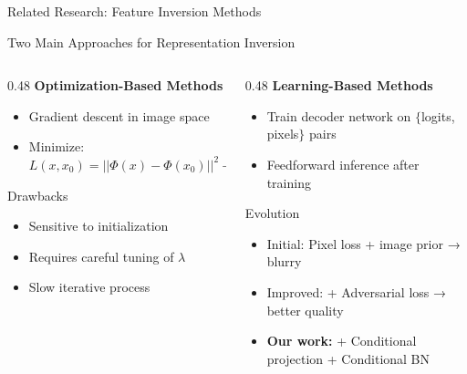 \documentclass{beamer}
\begin{document}
\begin{frame}{Related Research: Feature Inversion Methods}
\begin{block}{Two Main Approaches for Representation Inversion}

\begin{columns}[T]
\begin{column}{0.48\textwidth}
\centering
\textbf{Optimization-Based Methods}
\begin{itemize}
\item Gradient descent in image space
\item Minimize: 
\small
$L(x, x_0) = ||\Phi(x) - \Phi(x_0)||^2 + \lambda R(x)$
\normalsize

\end{itemize}

\begin{alertblock}{Drawbacks}
\begin{itemize}
\item Sensitive to initialization
\item Requires careful tuning of $\lambda$
\item Slow iterative process
\end{itemize}
\end{alertblock}
\end{column}

\begin{column}{0.48\textwidth}
\centering
\textbf{Learning-Based Methods}
\begin{itemize}
\item Train decoder network on $\{$logits, pixels$\}$ pairs
\item Feedforward inference after training

\end{itemize}

\begin{exampleblock}{Evolution}
\begin{itemize}
\item Initial: Pixel loss + image prior → blurry
\item Improved: + Adversarial loss → better quality
\item \textbf{Our work:} + Conditional projection + Conditional BN
\end{itemize}
\end{exampleblock}
\end{column}
\end{columns}

\end{block}

\end{frame}
\end{document}
